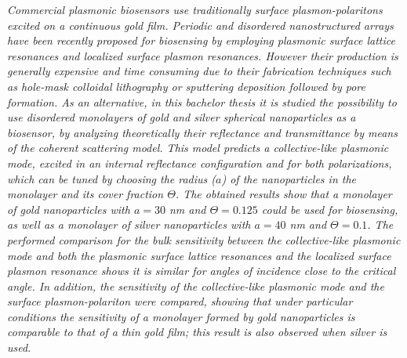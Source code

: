 \begin{abstracts}
\vspace*{.5cm}
\textit{
Commercial plasmonic biosensors use traditionally surface plasmon-polaritons excited on a continuous gold film. Periodic and disordered nanostructured arrays have been recently proposed for biosensing by employing plasmonic surface lattice resonances and localized surface plasmon resonances. However their production is generally expensive and time consuming due to their fabrication techniques such as hole-mask colloidal lithography or sputtering deposition followed by pore formation. As an alternative, in this bachelor thesis it is studied the possibility to use disordered monolayers of gold and silver spherical nanoparticles as a biosensor, by analyzing theoretically their reflectance and transmittance by means of the coherent scattering model. This model predicts a collective-like plasmonic mode, excited in an internal reflectance configuration and for both polarizations, which can be tuned by choosing the radius ($a$) of the nanoparticles in the monolayer and its cover fraction $\Theta$. The obtained results show that a monolayer of gold nanoparticles with $ a = 30 $ nm and $ \Theta = 0.125 $  could be used for biosensing, as well as a monolayer of silver nanoparticles with  $a=40$ nm and $\Theta=0.1$. The performed comparison for the bulk sensitivity between the collective-like plasmonic mode and both the plasmonic surface lattice resonances and the localized surface plasmon resonance shows it is similar for angles of incidence close to the critical angle. In addition, the sensitivity of the collective-like plasmonic mode and the surface plasmon-polariton were compared, showing that under particular conditions the sensitivity of a monolayer formed by gold nanoparticles is comparable to that of a thin gold film; this result is also observed when silver is used. }

\end{abstracts}


